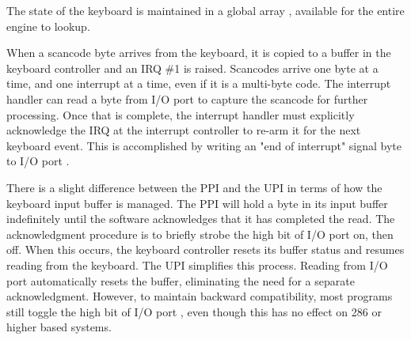 \documentclass[book.tex]{subfiles}
\begin{document}
\par
\begin{minipage}{\textwidth}

\end{minipage}

\par
The state of the keyboard is maintained in a global array , available for the entire engine to lookup.\\
\par
\begin{minipage}{\textwidth}

\end{minipage}

\par
\begin{minipage}{\textwidth}

\end{minipage}

\par
When a scancode byte arrives from the keyboard, it is copied to a buffer in the keyboard controller and an IRQ \#1 is raised. Scancodes arrive one byte at a time, and one interrupt at a time, even if it is a multi-byte code. The interrupt handler can read a byte from I/O port  to capture the scancode for further processing. Once that is complete, the interrupt handler must explicitly acknowledge the IRQ at the interrupt controller to re-arm it for the next keyboard event. This is accomplished by writing an "end of interrupt" signal byte to I/O port . 

\par
There is a slight difference between the PPI and the UPI in terms of how the keyboard input buffer is managed. The PPI will hold a byte in its input buffer indefinitely until the software acknowledges that it has completed the read. The acknowledgment procedure is to briefly strobe the high bit of I/O port  on, then off. When this occurs, the keyboard controller resets its buffer status and resumes reading from the keyboard. The UPI simplifies this process. Reading from I/O port  automatically resets the buffer, eliminating the need for a separate acknowledgment. However, to maintain backward compatibility, most programs still toggle the high bit of I/O port , even though this has no effect on 286 or higher based systems.\\
\end{document}
